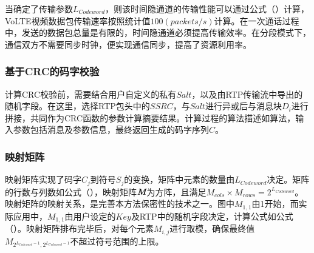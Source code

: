 当确定了传输参数$L_{Codeword}$，则该时间隐通道的传输性能可以通过公式（）计算，VoLTE视频数据包传输速率按照统计值$100(packets/s)$计算。在一次通话过程中，发送的数据包总量是有限的，时间隐通道必须提高传输效率。在分段模式下，通信双方不需要同步时钟，便实现通信同步，提高了资源利用率。

\subsubsection{基于CRC的码字校验}
\label{chap:zigzag:model:modulation:crc}

计算CRC校验前，需要结合用户自定义的私有$Salt$，以及由RTP传输流中导出的随机字段。在这里，选择RTP包头中的$SSRC$，与$Salt$进行异或后与消息块$D_{i}$进行拼接，共同作为CRC函数的参数计算摘要结果。计算过程的算法描述如算法，输入参数包括消息及参数信息，最终返回生成的码字序列$C$。


\subsubsection{映射矩阵}
\label{chap:zigzag:model:modulation:mapping}

映射矩阵实现了码字$C_{j}$到符号$S_{j}$的变换，矩阵中元素的数量由$L_{Codeword}$决定。矩阵的行数与列数如公式（），映射矩阵$\textit{\textbf{M}}$为方阵，且满足$M_{cols}\times M_{rows}=2^{L_{Codeword}}$。映射矩阵的映射关系，是完善本方法保密性的技术之一。图中$M_{1,1}$由1开始，而实际应用中，$M_{1,1}$由用户设定的$Key$及RTP中的随机字段决定，计算公式如公式（）。映射矩阵排布完毕后，对每个元素$M_{i,j}$进行取模，确保最终值$M_{2^{L_{Codeword}-1},2^{L_{Codeword}-1}}$不超过符号范围的上限。

